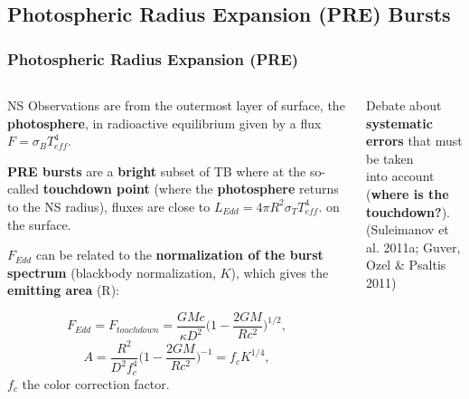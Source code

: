 






\subsection*{Photospheric Radius Expansion (PRE) Bursts}
\begin{frame}
\frametitle{Photospheric Radius Expansion (PRE)}

\begin{columns}[c]
\begin{column}{0.55\textwidth} 

\begin{enumerate}
\scriptsize{
 \item  NS Observations are from the outermost layer of surface, the {\bf photosphere}, in radioactive equilibrium given by a flux 
$F=\sigma_B T^4_{eff}.$
 
 \quad

\item {\bf PRE bursts} are a {\bf bright} subset of TB where  at the so-called {\bf touchdown point} (where the {\bf photosphere} returns to the NS radius), fluxes are close to $L_{Edd} = 4 \pi R^2 \sigma_T T^4_{eff}.$ on the surface.

\quad

\item  $F_{Edd}$ can be related to the {\bf normalization of the burst spectrum} (blackbody normalization, $K$),  which gives the  {\bf emitting area} (R):


$$F_{Edd} = F_{touchdown} = \frac{GMc}{\kappa D^2} \Big ( 1 - \frac{2GM}{Rc^2} \Big)^{1/2},$$
$$ A = \frac{R^2}{D^2f_c^4} \Big( 1 - \frac{2GM}{Rc^2} \Big )^{-1} = f_c  K^{1/4},$$
 $f_c$ the color correction factor.


 }
  \end{enumerate}
  
  

\end{column}
\begin{column}{0.7\textwidth}
\begin{center}
\scriptsize{
Debate about {\bf systematic errors} that must be taken\\ into account ({\bf where is the touchdown?}). }
\\{\tiny (Suleimanov et al. 2011a; Guver, Ozel $\&$ Psaltis 2011)} 

\quad


\end{center}
\end{column}
\end{columns}
\end{frame}

